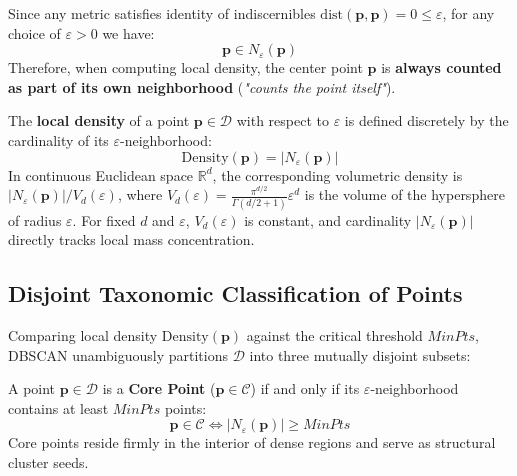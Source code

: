 \begin{remark}
Since any metric satisfies identity of indiscernibles $\mathrm{dist}(\mathbf{p}, \mathbf{p}) = 0 \le \varepsilon$, for any choice of $\varepsilon > 0$ we have:
\begin{equation}
    \mathbf{p} \in N_\varepsilon(\mathbf{p})
\end{equation}
Therefore, when computing local density, the center point $\mathbf{p}$ is \textbf{always counted as part of its own neighborhood} (\textit{"counts the point itself"}).
\end{remark}

\begin{definition}
The \textbf{local density} of a point $\mathbf{p} \in \mathcal{D}$ with respect to $\varepsilon$ is defined discretely by the cardinality of its $\varepsilon$-neighborhood:
\begin{equation}
    \mathrm{Density}(\mathbf{p}) = |N_\varepsilon(\mathbf{p})|
    \label{eq:dm-local-density}
\end{equation}
In continuous Euclidean space $\mathbb{R}^d$, the corresponding volumetric density is $|N_\varepsilon(\mathbf{p})| / V_d(\varepsilon)$, where $V_d(\varepsilon) = \frac{\pi^{d/2}}{\Gamma(d/2 + 1)} \varepsilon^d$ is the volume of the hypersphere of radius $\varepsilon$. For fixed $d$ and $\varepsilon$, $V_d(\varepsilon)$ is constant, and cardinality $|N_\varepsilon(\mathbf{p})|$ directly tracks local mass concentration.
\end{definition}

\subsection{Disjoint Taxonomic Classification of Points}

Comparing local density $\mathrm{Density}(\mathbf{p})$ against the critical threshold $MinPts$, DBSCAN unambiguously partitions $\mathcal{D}$ into three mutually disjoint subsets:

\begin{definition}
A point $\mathbf{p} \in \mathcal{D}$ is a \textbf{Core Point} ($\mathbf{p} \in \mathcal{C}$) if and only if its $\varepsilon$-neighborhood contains at least $MinPts$ points:
\begin{equation}
    \mathbf{p} \in \mathcal{C} \iff |N_\varepsilon(\mathbf{p})| \ge MinPts
    \label{eq:dm-core-point-condition}
\end{equation}
Core points reside firmly in the interior of dense regions and serve as structural cluster seeds.
\end{definition}

